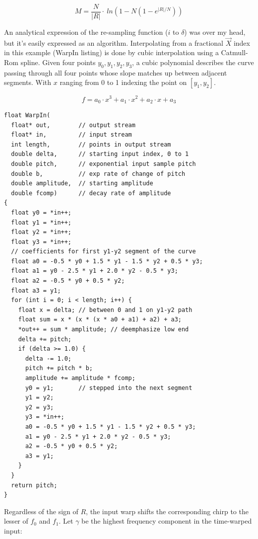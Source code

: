 \begin{equation}  \label{eq:M_N}
M = \frac{N}{|R|} \cdot\ ln\left( 1 - N(1-e^{|R|/N}) \right)
\end{equation}

An analytical expression of the re-sampling function ($i$ to $\delta$)
was over my head, but it's easily expressed as an algorithm.
Interpolating from a fractional $\vec{X}$ index in this example (WarpIn listing)
is done by cubic interpolation using a Catmull-Rom spline.
Given four points $y_0, y_1, y_2, y_3$, a cubic polynomial describes the curve
passing through all four points whose slope matches up between adjacent segments.
With $x$ ranging from 0 to 1 indexing the point on $[y_1, y_2]$.

\begin{equation}  \label{eq:cubic}
f = a_0 \cdot x^3 + a_1 \cdot x^2 + a_2 \cdot x + a_3
\end{equation}

\begin{lstlisting}[float,floatplacement=H]
float WarpIn(
  float* out,        // output stream
  float* in,         // input stream
  int length,        // points in output stream
  double delta,      // starting input index, 0 to 1
  double pitch,      // exponential input sample pitch
  double b,          // exp rate of change of pitch
  double amplitude,  // starting amplitude
  double fcomp)      // decay rate of amplitude
{
  float y0 = *in++;
  float y1 = *in++;
  float y2 = *in++;
  float y3 = *in++;
  // coefficients for first y1-y2 segment of the curve
  float a0 = -0.5 * y0 + 1.5 * y1 - 1.5 * y2 + 0.5 * y3;
  float a1 = y0 - 2.5 * y1 + 2.0 * y2 - 0.5 * y3;
  float a2 = -0.5 * y0 + 0.5 * y2;
  float a3 = y1;
  for (int i = 0; i < length; i++) {
    float x = delta; // between 0 and 1 on y1-y2 path
    float sum = x * (x * (x * a0 + a1) + a2) + a3;
    *out++ = sum * amplitude; // deemphasize low end
    delta += pitch;
    if (delta >= 1.0) {
      delta -= 1.0;
      pitch += pitch * b;
      amplitude += amplitude * fcomp;
      y0 = y1;       // stepped into the next segment
      y1 = y2;
      y2 = y3;
      y3 = *in++;
      a0 = -0.5 * y0 + 1.5 * y1 - 1.5 * y2 + 0.5 * y3;
      a1 = y0 - 2.5 * y1 + 2.0 * y2 - 0.5 * y3;
      a2 = -0.5 * y0 + 0.5 * y2;
      a3 = y1;
    }
  }
  return pitch;
}
\end{lstlisting}

Regardless of the sign of $R$, the input warp shifts the corresponding chirp
to the lesser of $f_0$ and $f_1$. Let $\gamma$ be the highest frequency component in the
time-warped input:

